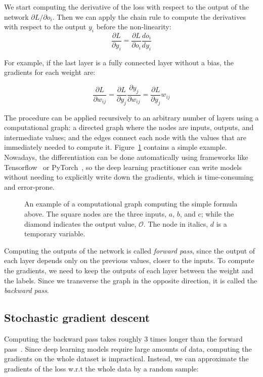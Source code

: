 We start computing the derivative of the loss with respect to the output of the network ${\partial L}/{\partial o_i}$.
Then we can apply the chain rule to compute the derivatives with respect to the output $y_i$ before the non-linearity:
\begin{equation*}
\frac{\partial L}{\partial y_i} = \frac{\partial L}{\partial o_i} \frac{d o_i}{d y_i}
\end{equation*}

For example, if the last layer is a fully connected layer without a bias, the gradients for each weight are:

\begin{equation*}
\frac{\partial L}{\partial w_{ij}} = \frac{\partial L}{\partial y_j} \frac{\partial y_j}{\partial w_{ij}} =  \frac{\partial L}{\partial y_j}  w_{ij}
\end{equation*}

The procedure can be applied recursively to an arbitrary number of layers using a computational graph: 
a directed graph where the nodes are inputs, outputs, and intermediate values; and the edges connect each node with the values that are immediately needed to compute it.
Figure~\ref{fig:comp_graph} contains a simple example.
Nowadays, the differentiation can be done automatically using frameworks like Tensorflow~\citep{tensorflow} or PyTorch~\citep{pytorch}, so the deep learning practitioner can write models without needing to explicitly write down the gradients, which is time-consuming and error-prone.

\begin{figure}[bht]
	\centering
	\caption{An example of a computational graph computing the simple formula above.
	The square nodes are the three inputs, $a$, $b$, and $c$; while the diamond indicates the output value, $\mathcal{O}$.
    The node in italics, $\mathit{d}$ is a temporary variable.}\label{fig:comp_graph}
\end{figure}

\newpage
Computing the outputs of the network is called \emph{forward pass}, since the output of each layer  
depends only on the previous values, closer to the inputs.
To compute the gradients, we need to keep the outputs of each layer between the weight and the labels.
Since we transverse the graph in the opposite direction, it is called the \emph{backward pass}.

\subsection{Stochastic gradient descent}\label{sec:sgd}
Computing the backward pass takes roughly 3 times longer than the forward pass~\citep{dl_course}.
Since deep learning models require large amounts of data, computing the gradients on the whole dataset is impractical.
Instead, we can approximate the gradients of the loss w.r.t the whole data by a random sample: 



